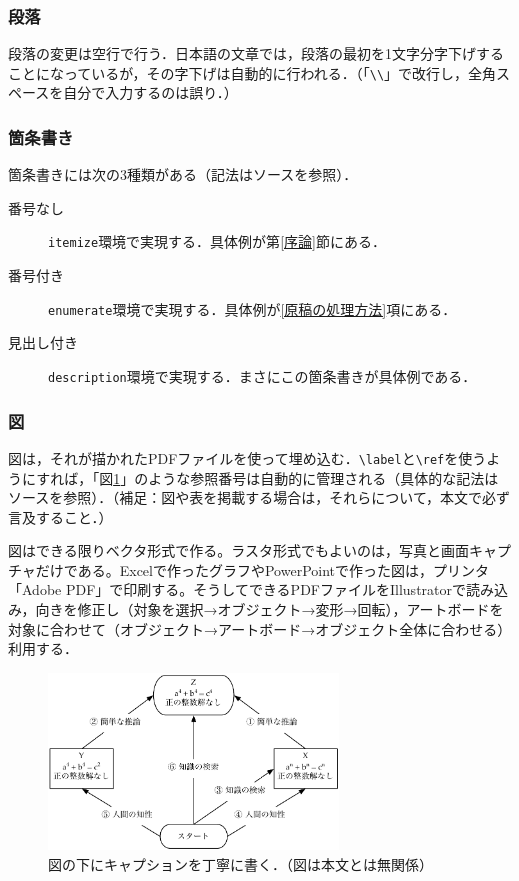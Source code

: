 \documentclass[uplatex,twocolumn,dvipdfmx]{jsarticle}
\begin{document}
\subsubsection{段落}

段落の変更は空行で行う．日本語の文章では，段落の最初を1文字分字下げすることになっているが，その字下げは自動的に行われる．（「\verb|\\|」で改行し，全角スペースを自分で入力するのは誤り．）

\subsubsection{箇条書き}

箇条書きには次の3種類がある（記法はソースを参照）．

\begin{description}
\item[番号なし] \verb|itemize|環境で実現する．具体例が第\ref{序論}節にある．
\item[番号付き] \verb|enumerate|環境で実現する．具体例が\ref{原稿の処理方法}項にある．
\item[見出し付き] \verb|description|環境で実現する．まさにこの箇条書きが具体例である．
\end{description}

\subsubsection{図}

図は，それが描かれたPDFファイルを使って埋め込む．\verb|\label|と\verb|\ref|を使うようにすれば，「図\ref{サンプル図}」のような参照番号は自動的に管理される（具体的な記法はソースを参照）．（補足：図や表を掲載する場合は，それらについて，本文で必ず言及すること．）

図はできる限りベクタ形式で作る。ラスタ形式でもよいのは，写真と画面キャプチャだけである。Excelで作ったグラフやPowerPointで作った図は，プリンタ「Adobe PDF」で印刷する。そうしてできるPDFファイルをIllustratorで読み込み，向きを修正し（対象を選択→オブジェクト→変形→回転），アートボードを対象に合わせて（オブジェクト→アートボード→オブジェクト全体に合わせる）利用する．

\begin{figure}[htb]
\centering
\includegraphics[width=77mm,clip]{figure.pdf}%
\caption{図の下にキャプションを丁寧に書く．（図は本文とは無関係）}\label{サンプル図}
\end{figure}
\end{document}
